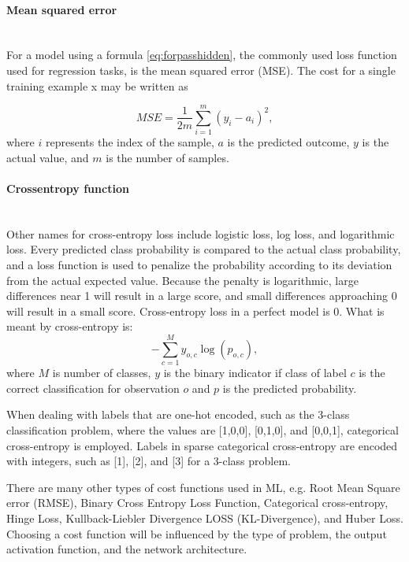 \paragraph{Mean squared error}\mbox{}\\
For a model using a formula \ref{eq:forpasshidden},
the commonly used loss function used for regression tasks, is the mean squared error (MSE). 
The cost for a single training example x may be written as


\begin{equation}
	MSE = \frac{1}{2m} \sum_{i=1}^{m} (y_i - a_i)^2,
\end{equation}
where
$i$ represents the index of the sample,
$a$ is the predicted outcome,
$y$ is the actual value, and
$m$ is the number of samples.

\paragraph{Crossentropy function}\mbox{}\\
Other names for cross-entropy loss include logistic loss, log loss, and logarithmic loss. Every predicted class probability is compared to the actual class probability, and a loss function is used to penalize the probability according to its deviation from the actual expected value. Because the penalty is logarithmic, large differences near 1 will result in a large score, and small differences approaching 0 will result in a small score. Cross-entropy loss in a perfect model is 0.
What is meant by cross-entropy is:
\begin{equation}
	-\sum_{c=1}^My_{o,c}\log(p_{o,c}),
\end{equation}
where $M$ is number of classes, $y$ is the binary indicator if class of label $c$ is the correct classification for observation $o$ and $p$ is the predicted probability.

When dealing with labels that are one-hot encoded, such as the 3-class classification problem, where the values are [1,0,0], [0,1,0], and [0,0,1], categorical cross-entropy is employed.
Labels in sparse categorical cross-entropy are encoded with integers, such as [1], [2], and [3] for a 3-class problem.



There are many other types of cost functions used in ML, e.g. Root Mean Square error (RMSE), Binary Cross Entropy Loss Function,  Categorical cross-entropy, Hinge Loss, Kullback-Liebler Divergence LOSS (KL-Divergence), and Huber Loss. Choosing a cost function will be influenced by the type of problem, the output activation function, and the network architecture.


